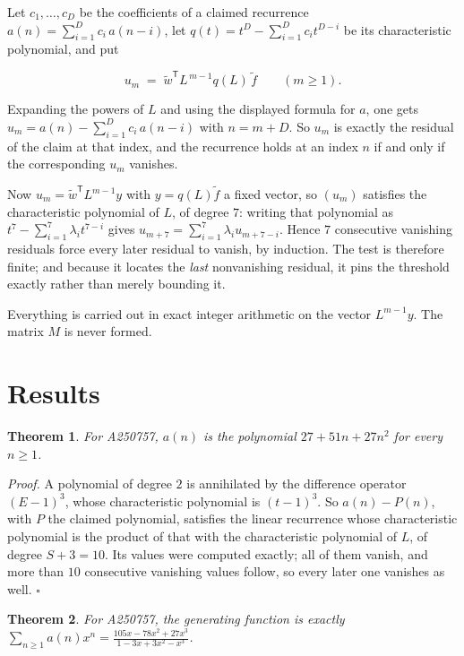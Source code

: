 \documentclass[11pt]{article}
\newtheorem{theorem}{Theorem}
\theoremstyle{definition}
\begin{document}
Let $c_1,\dots,c_D$ be the coefficients of a claimed recurrence $a(n) = \sum_{i=1}^{D} c_i\,a(n-i)$, let $q(t) = t^{D} - \sum_{i=1}^{D} c_i t^{D-i}$ be its characteristic polynomial, and put

\[u_m \;=\; \tilde w^{\mathsf T} L^{\,m-1} q(L)\,\tilde f \qquad (m \ge 1).\]

Expanding the powers of $L$ and using the displayed formula for $a$, one gets $u_m = a(n) - \sum_{i=1}^{D} c_i\,a(n-i)$ with $n = m + D$. So $u_m$ is exactly the residual of the claim at that index, and the recurrence holds at an index $n$ if and only if the corresponding $u_m$ vanishes.

Now $u_m = \tilde w^{\mathsf T} L^{m-1} y$ with $y = q(L)\tilde f$ a fixed vector, so $(u_m)$ satisfies the characteristic polynomial of $L$, of degree $7$: writing that polynomial as $t^{7} - \sum_{i=1}^{7} \lambda_i t^{7-i}$ gives $u_{m+7} = \sum_{i=1}^{7} \lambda_i u_{m+7-i}$. Hence $7$ consecutive vanishing residuals force every later residual to vanish, by induction. The test is therefore finite; and because it locates the {\itshape last} nonvanishing residual, it pins the threshold exactly rather than merely bounding it.

Everything is carried out in exact integer arithmetic on the vector $L^{m-1}y$. The matrix $M$ is never formed.

\section{Results}

\begin{theorem} For A250757, $a(n)$ is the polynomial $27 + 51n + 27n^{2}$ for every $n \ge 1$.\end{theorem}

{\itshape Proof.} A polynomial of degree $2$ is annihilated by the difference operator $(E-1)^{3}$, whose characteristic polynomial is $(t-1)^{3}$. So $a(n) - P(n)$, with $P$ the claimed polynomial, satisfies the linear recurrence whose characteristic polynomial is the product of that with the characteristic polynomial of $L$, of degree $S + 3 = 10$. Its values were computed exactly; all of them vanish, and more than $10$ consecutive vanishing values follow, so every later one vanishes as well. $\square$

\begin{theorem} For A250757, the generating function is exactly $\sum_{n\ge 1} a(n)x^n = \frac{105x - 78x^{2} + 27x^{3}}{1 - 3x + 3x^{2} - x^{3}}$.\end{theorem}
\end{document}
